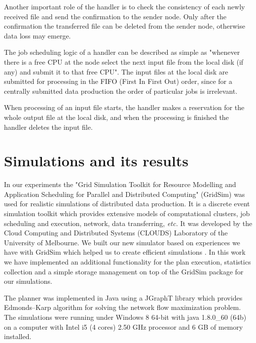 \documentclass{svjour3}                     %
\begin{document}
Another important role of the handler is to check the consistency of each newly received file and send the confirmation to the sender node. Only after the confirmation the transferred file can be deleted from the sender node, otherwise data loss may emerge. 

The job scheduling logic of a handler can be described as simple as "whenever there is a free CPU at the node select the next input file from the local disk (if any) and submit it to that free CPU". The input files at the local disk are submitted for processing in the FIFO (First In First Out) order, since for a centrally submitted data production the order of particular jobs is irrelevant. 

When processing of an input file starts, the handler makes a reservation for the whole output file at the local disk, and when the processing is finished the handler deletes the input file.

\section{Simulations and its results}
\label{simulations}
In our experiments the "Grid Simulation Toolkit for Resource Modelling and Application Scheduling for Parallel and Distributed Computing" (GridSim) \cite{GridSim} was used for realistic simulations of distributed data production. It is a discrete event simulation toolkit which provides extensive models of computational clusters, job scheduling and execution, network, data transferring, \textit{etc.} It was developed by the Cloud Computing and Distributed Systems (CLOUDS) Laboratory of the University of Melbourne. We built our new simulator based on experiences we have with GridSim which helped us to create efficient simulations \cite{alea2}. In this work we have implemented an additional functionality for the plan execution, statistics collection and a simple storage management   on top of the GridSim package for our simulations.

The planner was implemented in Java using a JGraphT \cite{JGraphT} library which provides Edmonds–Karp algorithm \cite{Network_flows} for solving the network flow maximization problem. The simulations were running under Windows 8 64-bit with java 1.8.0\_60 (64b) on a computer with Intel i5 (4 cores) 2.50 GHz processor and 6 GB of memory installed. 
\end{document}
